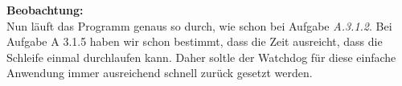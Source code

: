 	\textbf{Beobachtung:}\\
	Nun läuft das Programm genaus so durch, wie schon bei Aufgabe \emph{A.3.1.2}. Bei Aufgabe A 3.1.5 haben wir schon bestimmt, dass die Zeit 
	ausreicht, dass die Schleife einmal durchlaufen kann. Daher soltle der Watchdog für diese einfache Anwendung immer ausreichend schnell zurück gesetzt werden.
